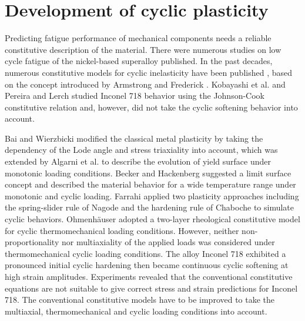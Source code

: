 \section{Development of cyclic plasticity}
\noindent
Predicting fatigue performance of mechanical components needs a reliable constitutive description of the material. There were numerous studies on low cycle fatigue of the nickel-based superalloy published. In the past decades, numerous constitutive models for cyclic inelasticity have been published \cite{ohno1993kinematic, Pun2014138, Abdel2000, Kang2004299}, based on the concept introduced by Armstrong and Frederick \cite{armstrong1966mathematical}. Kobayashi et al. \cite{Kobayashi2008389} and Pereira and Lerch \cite{Pereira2001715} studied Inconel 718 behavior using the Johnson-Cook constitutive relation and, however, did not take the cyclic softening behavior into account.


Bai and Wierzbicki \cite{Bai20081071} modified the classical metal plasticity by taking the dependency of the Lode angle and stress triaxiality into account, which was extended by Algarni et al. \cite{Algarni2015140} to describe the evolution of yield surface under monotonic loading conditions. Becker and Hackenberg \cite{Becker2011596} suggested a limit surface concept and described the material behavior for a wide temperature range under monotonic and cyclic loading.
Farrahi \cite{Farrahi2014245} applied two plasticity approaches including the spring-slider rule of Nagode and the hardening rule of Chaboche to simulate cyclic behaviors.
Ohmenh\"{a}user \cite{Ohmenhauser2014631} adopted a two-layer rheological constitutive model for cyclic thermomechanical loading conditions.
However, neither non-proportionality nor multiaxiality of the applied loads was considered under thermomechanical cyclic loading conditions.
The alloy Inconel 718 exhibited a pronounced initial cyclic hardening then became continuous cyclic softening at high strain amplitudes. Experiments revealed that the conventional constitutive equations are not suitable to give correct stress and strain predictions for Inconel 718. The conventional constitutive models have to be improved to take the multiaxial, thermomechanical and cyclic loading conditions into account.

